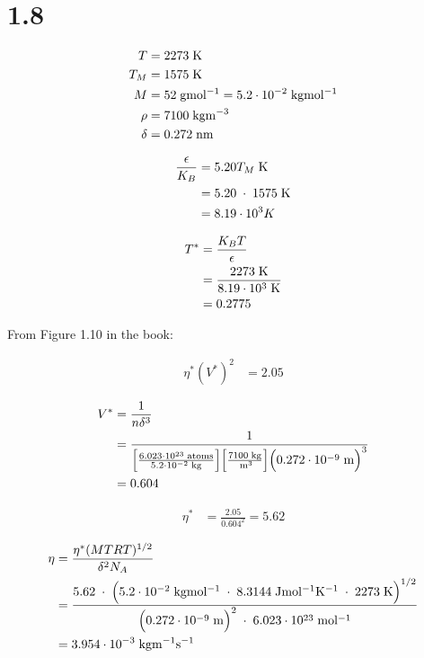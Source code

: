 \documentclass[11pt]{article}
\begin{document}
    
    
    \section{1.8}\label{section}

    \begin{align}
    T &= 2273 \; \mathrm{K} \nonumber \\
    T_M &= 1575 \; \mathrm{K} \nonumber \\
    M &= 52 \; \mathrm{gmol^{-1}} = 5.2 \cdot 10^{-2} \; \mathrm{kgmol^{-1} }\nonumber \\
    \rho &= 7100 \; \mathrm{kgm^{-3}} \nonumber \\
    \delta &= 0.272 \; \mathrm{nm} \nonumber
\end{align}

    \begin{align}
\frac{\epsilon}{K_B} &= 5.20T_M \; \mathrm{K} \\
&= 5.20 \; \cdot \; 1575 \; \mathrm{K} \nonumber \\
&= 8.19 \cdot 10^{3} K \nonumber
\end{align}

    \begin{align}
T^{*} &= \frac{K_BT}{\epsilon} \\
&= \frac{2273 \; \mathrm{K}}{8.19 \cdot 10^{3} \; \mathrm{K}} \nonumber \\
&= 0.2775 \nonumber
\end{align}

    From Figure 1.10 in the book:

\begin{align}
\eta^*(V^*)^2 &= 2.05 \nonumber
\end{align}

    \begin{align}
V^* &= \frac{1}{n\delta^3} \\
&= \frac{1}{ \Big[ \frac{ 6.023 \cdot 10^{23} \; \mathrm{atoms} } { 5.2 \cdot 10^{-2} \; \mathrm{kg} } \Big] \Big[ \frac{7100 \; \mathrm{kg}}{\; \mathrm{m^{3}}} \Big] \Big( 0.272 \cdot 10^{-9} \; \mathrm{m} \Big)^3 } \nonumber \\
&= 0.604 \nonumber
\end{align}

    \begin{align}
\eta^* &= \frac{2.05}{0.604^2} =5.62 \nonumber
\end{align}

    \begin{align}
\eta &= \frac{\eta^* (MTRT)^{1/2}}{\delta^2N_A} \\
&= \frac{5.62 \; \cdot \; \Big( 5.2 \cdot 10^{-2} \; \mathrm{kgmol^{-1}} \; \cdot \; 8.3144 \; \mathrm{Jmol^{-1}K^{-1}} \; \cdot \; 2273 \; \mathrm{K} \Big)^{1/2}}{\Big(0.272 \cdot 10^{-9} \; \mathrm{m} \Big)^2 \; \cdot \; 6.023 \cdot 10^{23} \; \mathrm{mol^{-1}}} \nonumber \\
&= 3.954 \cdot 10^{-3} \; \mathrm{kgm^{-1}s^{-1}} \nonumber
\end{align}


    
    



    
    
\end{document}
